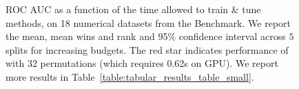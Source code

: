 \documentclass{article}
\begin{document}
\begin{figure}[t]
     \centering
     \begin{subfigure}[t]{0.32\textwidth}
         \centering
         
     \end{subfigure}
     \begin{subfigure}[t]{0.32\textwidth}
         \centering
         
     \end{subfigure}
     \begin{subfigure}[t]{0.32\textwidth}
         \centering
         
     \end{subfigure}
     \vspace{-.6cm}
     \begin{subfigure}[b]{1.0\textwidth}
         \centering
         
     \end{subfigure}
     \vspace{0cm}
     \caption{ROC AUC as a function of the time allowed to train \& tune methods, on 18 numerical datasets from the \openmlcc{} Benchmark. We report the mean, mean wins and rank and 95\% confidence interval across $5$ splits for increasing budgets. 
     The red star indicates performance of \methodname{} with 32 permutations (which requires 0.62s on GPU). We report more results in Table~\ref{table:tabular_results_table_small}.
     }
     \label{fig:perfovertime}
\end{figure}
\end{document}

